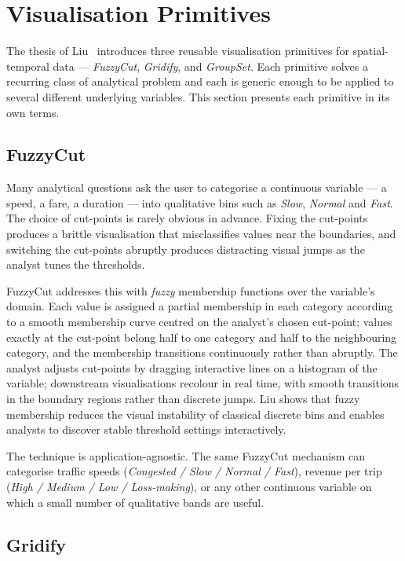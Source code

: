 \section{Visualisation Primitives}
\label{sec:theory:primitives}

The thesis of Liu~\cite{liu2022} introduces three reusable
visualisation primitives for spatial-temporal data ---
\emph{FuzzyCut}, \emph{Gridify}, and \emph{GroupSet}. Each
primitive solves a recurring class of analytical problem and
each is generic enough to be applied to several different
underlying variables. This section presents each primitive in
its own terms.

\subsection{FuzzyCut}
\label{sec:theory:fuzzycut}

Many analytical questions ask the user to categorise a
continuous variable --- a speed, a fare, a duration --- into
qualitative bins such as \emph{Slow}, \emph{Normal} and
\emph{Fast}. The choice of cut-points is rarely obvious in
advance. Fixing the cut-points produces a brittle visualisation
that misclassifies values near the boundaries, and switching
the cut-points abruptly produces distracting visual jumps as
the analyst tunes the thresholds.

FuzzyCut addresses this with \emph{fuzzy} membership functions
over the variable's domain. Each value is assigned a partial
membership in each category according to a smooth membership
curve centred on the analyst's chosen cut-point; values exactly
at the cut-point belong half to one category and half to the
neighbouring category, and the membership transitions
continuously rather than abruptly. The analyst adjusts
cut-points by dragging interactive lines on a histogram of the
variable; downstream visualisations recolour in real time, with
smooth transitions in the boundary regions rather than discrete
jumps. Liu shows that fuzzy membership reduces the visual
instability of classical discrete bins and enables analysts to
discover stable threshold settings interactively.

The technique is application-agnostic. The same FuzzyCut
mechanism can categorise traffic speeds (\emph{Congested /
Slow / Normal / Fast}), revenue per trip (\emph{High / Medium
/ Low / Loss-making}), or any other continuous variable on
which a small number of qualitative bands are useful.

\subsection{Gridify}
\label{sec:theory:gridify}


